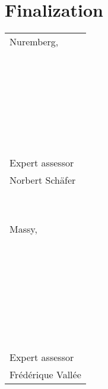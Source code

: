 \section{Finalization}



\begin{flushleft}
\tablefirsthead{}
\tablehead{}
\tabletail{}
\tablelasttail{}
\begin{supertabular}{l{17.904999cm}}
\\
Nuremberg, \\
~

~

~
\\
~
\\
\\
Expert assessor\\

Norbert Sch\"afer\\
~
\\
\\
\\
\\
\\

Massy, \\
~

~

~
\\
~
\\
\\
\\
\\
Expert assessor\\

Fr\'ed\'erique Vall\'ee\\
\end{supertabular}
\end{flushleft}

\bigskip


\bigskip



\bigskip
